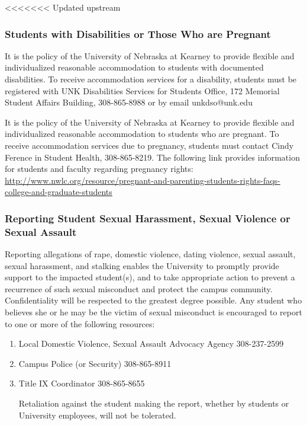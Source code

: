 \documentclass[12pt,fullpage]{article}
\newcounter{ex}\setcounter{ex}{0}
\begin{document}
<<<<<<< Updated upstream



\subsubsection*{Students with Disabilities or Those Who are Pregnant}

It is the policy of the University of Nebraska at Kearney to provide flexible and individualized reasonable accommodation to students with documented disabilities. To receive accommodation services for a disability, students must be registered with UNK Disabilities Services for Students Office, 172 Memorial Student Affairs Building, 308-865-8988 or by email unkdso@unk.edu


It is the policy of the University of Nebraska at Kearney to provide flexible and individualized reasonable accommodation to students who are pregnant. To receive accommodation services due to pregnancy, students must contact Cindy Ference in Student Health, 308-865-8219. The following link provides information for students and faculty regarding pregnancy rights:  \small \url{ http://www.nwlc.org/resource/pregnant-and-parenting-students-rights-faqs-college-and-graduate-students} \normalsize 

\subsubsection*{Reporting Student Sexual Harassment, Sexual Violence or Sexual Assault}


Reporting allegations of rape, domestic violence, dating violence, sexual assault, sexual harassment, and stalking enables the University to promptly provide support to the impacted student(s), and to take appropriate action to prevent a recurrence of such sexual misconduct and protect the campus community. Confidentiality will be respected to the greatest degree possible. Any student who believes she or he may be the victim of sexual misconduct is encouraged to report to one or more of the following resources:

\begin{enumerate}

\item Local Domestic Violence, Sexual Assault Advocacy Agency 308-237-2599

\item Campus Police (or Security) 308-865-8911

\item Title IX Coordinator 308-865-8655

Retaliation against the student making the report, whether by students or University employees, will not be tolerated.

\end{enumerate}
\end{document}
